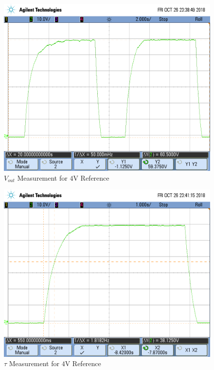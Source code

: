 \FloatBarrier

\FloatBarrier

\begin{figure}[h!]
	\centering
	\includegraphics[scale=0.75]{../images/scope_7.png}
	\caption{$V_{out}$ Measurement for $4$\si{\volt} Reference}
	\label{fig:scope_7}
\end{figure}

\FloatBarrier

\FloatBarrier

\begin{figure}[h!]
	\centering
	\includegraphics[scale=0.75]{../images/scope_8.png}
	\caption{$\tau$ Measurement for $4$\si{\volt} Reference}
	\label{fig:scope_8}
\end{figure}


